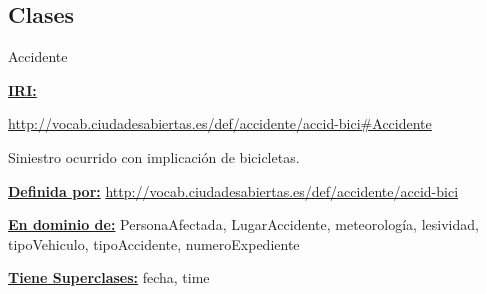 \subsection{Clases}



\begin{mybox}{Accidente}
\begin{flushleft}
\underline{\textbf{IRI:}}

\url{http://vocab.ciudadesabiertas.es/def/accidente/accid-bici#Accidente}
\newline

Siniestro ocurrido con implicación de bicicletas.
\newline

\underline{\textbf{Definida por:}}
\url{http://vocab.ciudadesabiertas.es/def/accidente/accid-bici}
\newline


\underline{\textbf{En dominio de:}}
\newline PersonaAfectada, \hspace{2em} LugarAccidente,	\hspace{2em}meteorología,
\newline lesividad,	\hspace{2em}tipoVehiculo,	\hspace{2em}tipoAccidente,
\newline numeroExpediente
	
\underline{\textbf{Tiene Superclases:}}
\newline fecha, \hspace{2em} time



\end{flushleft}
\end{mybox}


